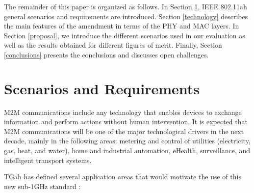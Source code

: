 \documentclass[]{article}
\begin{document}
The remainder of this paper is organized as follows. In Section \ref{design}, IEEE 802.11ah general scenarios and requirements are introduced. Section \ref{technology} describes the main features of the amendment in terms of the PHY and MAC layers. In Section \ref{proposal}, we introduce the different scenarios used in our evaluation as well as the results obtained for different figures of merit. Finally, Section \ref{conclusions} presents the conclusions and discusses open challenges.



\section{Scenarios and Requirements} \label{design}

M2M communications include any technology that enables devices to exchange information and perform actions without human intervention. It is expected that M2M communications will be one of the major technological drivers in the next decade, mainly in the following areas: metering and control of utilities (electricity, gas, heat, and water), home and industrial automation, eHealth, surveillance, and intelligent transport systems.

TGah has defined several application areas that would motivate the use of this new sub-1GHz standard \cite{aust2012ieee}:
\end{document}
